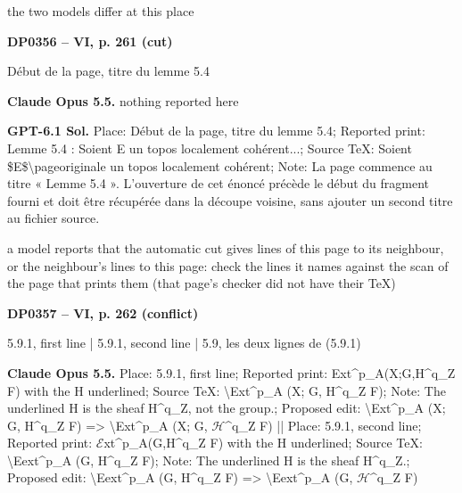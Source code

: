 the two models differ at this place\par
\par\noindent\hypertarget{DP0356}{}\textbf{DP0356 -- VI, p. 261 (cut)}\par
Début de la page, titre du lemme 5.4\par
\textbf{Claude Opus 5.5.} nothing reported here\par
\textbf{GPT-6.1 Sol.} Place: Début de la page, titre du lemme 5.4; Reported print: Lemme 5.4 : Soient E un topos localement cohérent...; Source TeX: Soient \$E\$\textbackslash{}pageoriginale un topos localement cohérent; Note: La page commence au titre « Lemme 5.4 ». L'ouverture de cet énoncé précède le début du fragment fourni et doit être récupérée dans la découpe voisine, sans ajouter un second titre au fichier source.\par
a model reports that the automatic cut gives lines of this page to its neighbour, or the neighbour's lines to this page: check the lines it names against the scan of the page that prints them (that page's checker did not have their TeX)\par
\par\noindent\hypertarget{DP0357}{}\textbf{DP0357 -- VI, p. 262 (conflict)}\par
5.9.1, first line | 5.9.1, second line | 5.9, les deux lignes de (5.9.1)\par
\textbf{Claude Opus 5.5.} Place: 5.9.1, first line; Reported print: Ext\textasciicircum{}p\_A(X;G,H\textasciicircum{}q\_Z F) with the H underlined; Source TeX: \textbackslash{}Ext\textasciicircum{}p\_A (X; G, H\textasciicircum{}q\_Z F); Note: The underlined H is the sheaf H\textasciicircum{}q\_Z, not the group.; Proposed edit: \textbackslash{}Ext\textasciicircum{}p\_A (X; G, H\textasciicircum{}q\_Z F) =\allowbreak > \textbackslash{}Ext\textasciicircum{}p\_A (X; G, \ensuremath{\mathcal{H}}\textasciicircum{}q\_Z F) || Place: 5.9.1, second line; Reported print: \ensuremath{\mathcal{E}}xt\textasciicircum{}p\_A(G,H\textasciicircum{}q\_Z F) with the H underlined; Source TeX: \textbackslash{}Eext\textasciicircum{}p\_A (G, H\textasciicircum{}q\_Z F); Note: The underlined H is the sheaf H\textasciicircum{}q\_Z.; Proposed edit: \textbackslash{}Eext\textasciicircum{}p\_A (G, H\textasciicircum{}q\_Z F) =\allowbreak > \textbackslash{}Eext\textasciicircum{}p\_A (G, \ensuremath{\mathcal{H}}\textasciicircum{}q\_Z F)\par
